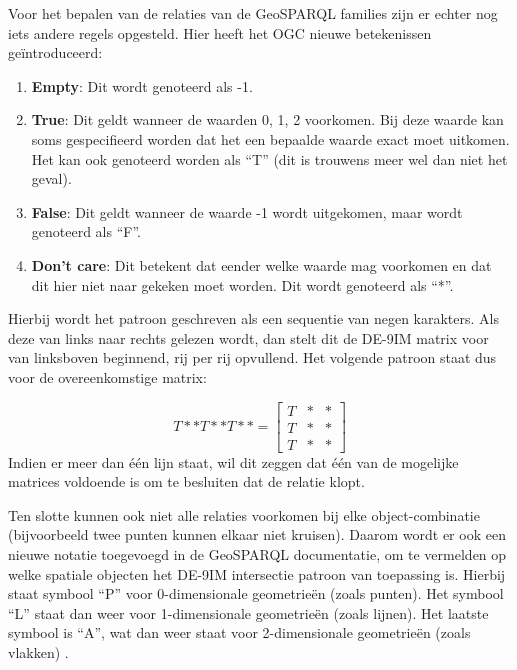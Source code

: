 Voor het bepalen van de relaties van de GeoSPARQL families zijn er echter nog iets andere regels opgesteld. Hier heeft het OGC nieuwe betekenissen geïntroduceerd: 
\begin{enumerate}
    \item \textbf{Empty}: Dit wordt genoteerd als -1.
    \item \textbf{True}: Dit geldt wanneer de waarden 0, 1, 2 voorkomen. Bij deze waarde kan soms gespecifieerd worden dat het een bepaalde waarde exact moet uitkomen. Het kan ook genoteerd worden als ``T'' (dit is trouwens meer wel dan niet het geval).
    \item \textbf{False}: Dit geldt wanneer de waarde -1 wordt uitgekomen, maar wordt genoteerd als ``F''.
    \item \textbf{Don't care}: Dit betekent dat eender welke waarde mag voorkomen en dat dit hier niet naar gekeken moet worden. Dit wordt genoteerd als ``*''.
\end{enumerate}
Hierbij wordt het patroon geschreven als een sequentie van negen karakters. Als deze van links naar rechts gelezen wordt, dan stelt dit de DE-9IM matrix voor van linksboven beginnend, rij per rij opvullend. Het volgende patroon staat dus voor de overeenkomstige matrix:

\begin{equation*}
    T**T**T** = 
    \begin{bmatrix}
    T & * & *\\
    T & * & *\\
    T & * & *
    \end{bmatrix}
\end{equation*}
Indien er meer dan één lijn staat, wil dit zeggen dat één van de mogelijke matrices voldoende is om te besluiten dat de relatie klopt.

Ten slotte kunnen ook niet alle relaties voorkomen bij elke object-combinatie (bijvoorbeeld twee punten kunnen elkaar niet kruisen). Daarom wordt er ook een nieuwe notatie toegevoegd in de GeoSPARQL documentatie, om te vermelden op welke spatiale objecten het DE-9IM intersectie patroon van toepassing is. Hierbij staat symbool ``P'' voor 0-dimensionale geometrieën (zoals punten). Het symbool ``L'' staat dan weer voor 1-dimensionale geometrieën (zoals lijnen). Het laatste symbool is ``A'', wat dan weer staat voor 2-dimensionale geometrieën (zoals vlakken) \cite{ogcdocs}.


